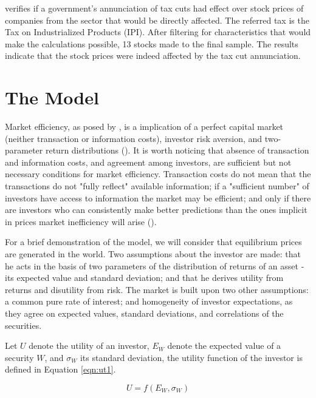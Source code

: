 \documentclass[cic,tc, english]{iiufrgs}
\begin{document}
    \citet{gabrielribeiro2013} verifies if a government's annunciation of tax cuts had effect over stock prices of companies from the sector that would be directly affected. The referred tax is the Tax on Industrialized Products (IPI). After filtering for characteristics that would make the calculations possible, 13 stocks made to the final sample. The results indicate that the stock prices were indeed affected by the tax cut annunciation.

\chapter{The Model} \label{chapter_model}

    Market efficiency, as posed by \citet{fama1970}, is a implication of a perfect capital market (neither transaction or information costs), investor risk aversion, and two-parameter return distributions (\citet{famamcbeth1973}). It is worth noticing that absence of transaction and information costs, and agreement among investors, are sufficient but not necessary conditions for market efficiency. Transaction costs do not mean that the transactions do not "fully reflect" available information; if a "sufficient number" of investors have access to information the market may be efficient; and only if there are investors who can consistently make better predictions than the ones implicit in prices market inefficiency will arise (\citet{fama1970}).
    
    For a brief demonstration of the model, we will consider that equilibrium prices are generated in the \citet{sharpe1964} world. Two assumptions about the investor are made: that he acts in the basis of two parameters of the distribution of returns of an asset - its expected value and standard deviation; and that he derives utility from returns and disutility from risk. The market is built upon two other assumptions: a common pure rate of interest; and homogeneity of investor expectations, as they agree on expected values, standard deviations, and correlations of the securities.
    
    Let $U$ denote the utility of an investor, $E_W$ denote the expected value of a security $W$, and $\sigma_W$ its standard deviation, the utility function of the investor is defined in Equation \ref{eqn:ut1}.
    
    \begin{equation}
        \label{eqn:ut1}
        U = f(E_W, \sigma_W)
    \end{equation}
    
\end{document}

